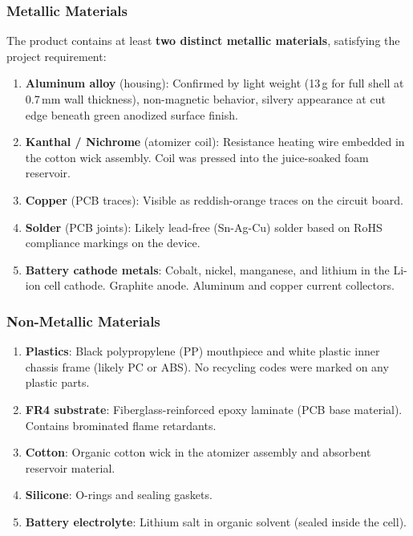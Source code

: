 \subsubsection{Metallic Materials}

The product contains at least \textbf{two distinct metallic materials}, satisfying the project requirement:

\begin{enumerate}
    \item \textbf{Aluminum alloy} (housing): Confirmed by light weight (13\,g for full shell at 0.7\,mm wall thickness), non-magnetic behavior, silvery appearance at cut edge beneath green anodized surface finish.
    \item \textbf{Kanthal / Nichrome} (atomizer coil): Resistance heating wire embedded in the cotton wick assembly. Coil was pressed into the juice-soaked foam reservoir.
    \item \textbf{Copper} (PCB traces): Visible as reddish-orange traces on the circuit board.
    \item \textbf{Solder} (PCB joints): Likely lead-free (Sn-Ag-Cu) solder based on RoHS compliance markings on the device.
    \item \textbf{Battery cathode metals}: Cobalt, nickel, manganese, and lithium in the Li-ion cell cathode. Graphite anode. Aluminum and copper current collectors.
\end{enumerate}

\subsubsection{Non-Metallic Materials}

\begin{enumerate}
    \item \textbf{Plastics}: Black polypropylene (PP) mouthpiece and white plastic inner chassis frame (likely PC or ABS). No recycling codes were marked on any plastic parts.
    \item \textbf{FR4 substrate}: Fiberglass-reinforced epoxy laminate (PCB base material). Contains brominated flame retardants.
    \item \textbf{Cotton}: Organic cotton wick in the atomizer assembly and absorbent reservoir material.
    \item \textbf{Silicone}: O-rings and sealing gaskets.
    \item \textbf{Battery electrolyte}: Lithium salt in organic solvent (sealed inside the cell).
\end{enumerate}

